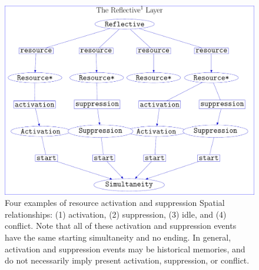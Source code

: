 \begin{figure}
\center
\includegraphics[width=12cm]{gfx/example_resource_conflict}
\caption[Four examples of resource activation and suppression Spatial
  relationships.]{Four examples of resource activation and suppression
  Spatial relationships: (1) activation, (2) suppression, (3) idle,
  and (4) conflict.  Note that all of these activation and suppression
  events have the same starting simultaneity and no ending.  In
  general, activation and suppression events may be historical
  memories, and do not necessarily imply present activation,
  suppression, or conflict.}
\label{figure:example_resource_conflict}
\end{figure}

